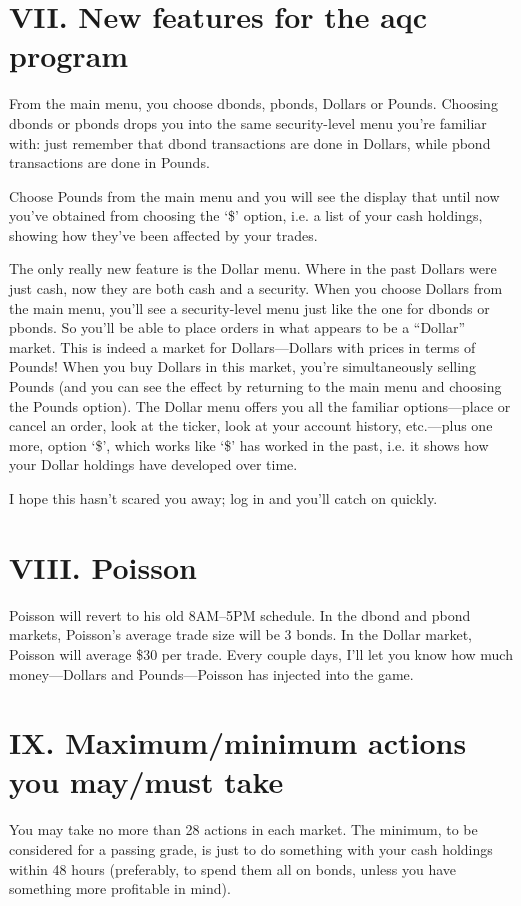 \section{VII. New features for the aqc program}%
From the main menu, you choose dbonds, pbonds, Dollars or Pounds.
Choosing dbonds or pbonds drops you into the same security-level menu
you're familiar with: just remember that dbond transactions are done
in Dollars, while pbond transactions are done in Pounds.

Choose Pounds from the main menu and you will see the display that until
now you've obtained from choosing the `\$' option, i.e. a list of your
cash holdings, showing how they've been affected by your trades.

The only really new feature is the Dollar menu.  Where in the past
Dollars were just cash, now they are both cash and a security.  When
you choose Dollars from the main menu, you'll see a security-level
menu just like the one for dbonds or pbonds.  So you'll be able to
place orders in what appears to be a ``Dollar'' market.  This is indeed
a market for Dollars---Dollars with prices in terms of Pounds!  When you
buy Dollars in this market, you're simultaneously selling Pounds (and
you can see the effect by returning to the main menu and choosing the
Pounds option).  The Dollar menu offers you all the familiar
options---place or cancel an order, look at the ticker, look at your
account history, etc.---plus one more, option `\$', which works like
`\$' has worked in the past, i.e. it shows how your Dollar holdings
have developed over time.

I hope this hasn't scared you away; log in and you'll catch on
quickly.

\section{VIII. Poisson}%
Poisson will revert to his old 8AM--5PM schedule.  In the dbond
and pbond markets, Poisson's average trade size will be 3 bonds.  In
the Dollar market, Poisson will average \$30 per trade.  Every couple
days, I'll let you know how much money---Dollars and Pounds---Poisson
has injected into the game.

\section{IX. Maximum/minimum actions you may/must take}%
You may take no more than 28 actions in each market.  The minimum, to
be considered for a passing grade, is just to do something with your
cash holdings within 48 hours (preferably, to spend them all on bonds,
unless you have something more profitable in mind).

